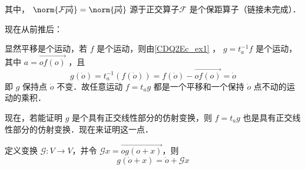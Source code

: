 其中， $\norm{\mathcal F\overrightarrow{pq}}=\norm{\overrightarrow{pq}}$ 源于正交算子$\mathcal F$ 是个保距算子（链接未完成）．

现在从前推后：

显然平移是个运动，若 $f$ 是个运动，则由\autoref{CDQ2Ec_ex1} ， $g=t_a^{-1} f$ 是个运动，其中 $a=\overrightarrow{of(o)}$ ，且
\begin{equation}
g(\dot o)=t_a^{-1}(f(\dot o))=f(\dot o)-\overrightarrow{of(o)}=\dot o
\end{equation}
即 $g$ 保持点 $\dot o$ 不变．故任意运动 $f=t_ag$ 都是一个平移和一个保持 $\dot o$ 点不动的运动的乘积．

现在，若能证明 $g$ 是个具有正交线性部分的仿射变换，则 $f=t_a g$ 也是具有正交线性部分的仿射变换．现在来证明这一点．

定义变换 $\mathcal G:V\rightarrow V$，并令 $\mathcal G x=\overrightarrow{og(o+x)}$，则
\begin{equation}
g(\dot o+x)=\dot o+\mathcal G x
\end{equation}
